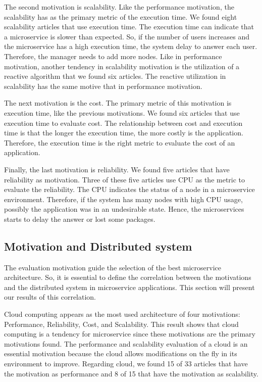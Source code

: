 The second motivation is scalability. Like the performance motivation, the scalability has as the primary metric of the execution time. We found eight scalability articles that use execution time. The execution time can indicate that a microservice is slower than expected. So, if the number of users increases and the microservice has a high execution time, the system delay to answer each user. Therefore, the manager needs to add more nodes. Like in performance motivation, another tendency in scalability motivation is the utilization of a reactive algorithm that we found six articles. The reactive utilization in scalability has the same motive that in performance motivation. 

The next motivation is the cost. The primary metric of this motivation is execution time, like the previous motivations. We found six articles that use execution time to evaluate cost. The relationship between cost and execution time is that the longer the execution time, the more costly is the application. Therefore, the execution time is the right metric to evaluate the cost of an application.

Finally, the last motivation is reliability. We found five articles that have reliability as motivation. Three of these five articles use CPU as the metric to evaluate the reliability. The CPU indicates the status of a node in a microservice environment. Therefore, if the system has many nodes with high CPU usage, possibly the application was in an undesirable state. Hence, the microservices starts to delay the answer or lost some packages. 

\subsection{Motivation and Distributed system}
The evaluation motivation guide the selection of the best microservice architecture. So, it is essential to define the correlation between the motivations and the distributed system in microservice applications. This section will present our results of this correlation.

Cloud computing appears as the most used architecture of four motivations: Performance, Reliability, Cost, and Scalability. This result shows that cloud computing is a tendency for microservice since these motivations are the primary motivations found. The performance and scalability evaluation of a cloud is an essential motivation because the cloud allows modifications on the fly in its environment to improve. Regarding cloud, we found 15 of 33 articles that have the motivation as performance and 8 of 15 that have the motivation as scalability.

